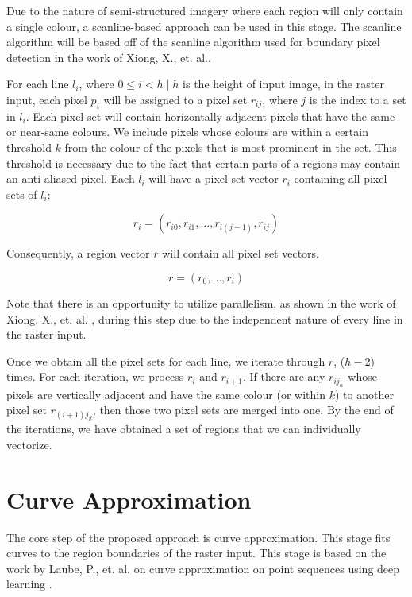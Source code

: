 Due to the nature of semi-structured imagery where each region will only contain a single colour, a scanline-based approach can be used in this stage. The scanline algorithm will be based off of the scanline algorithm used for boundary pixel detection in the work of Xiong, X., et. al..

For each line $l_{i}$, where $0 \leq i < h \mid h$ is the height of input image, in the raster input, each pixel $p_{i}$ will be assigned to a pixel set $r_{ij}$, where $j$ is the index to a set in $l_{i}$. Each pixel set will contain horizontally adjacent pixels that have the same or near-same colours. We include pixels whose colours are within a certain threshold $k$ from the colour of the pixels that is most prominent in the set. This threshold is necessary due to the fact that certain parts of a regions may contain an anti-aliased pixel. Each $l_{i}$ will have a pixel set vector $r_{i}$ containing all pixel sets of $l_{i}$:

$$ r_{i} = (r_{i0}, r_{i1}, \ldots, r_{i(j - 1)}, r_{ij}) $$

Consequently, a region vector $r$ will contain all pixel set vectors.

$$ r = (r_{0}, \ldots, r_{i}) $$

Note that there is an opportunity to utilize parallelism, as shown in the work of Xiong, X., et. al. \cite{realtimevectorizationgpu}, during this step due to the independent nature of every line in the raster input.

Once we obtain all the pixel sets for each line, we iterate through $r$, ($h - 2$) times. For each iteration, we process $r_{i}$ and $r_{i + 1}$. If there are any $r_{ij_{\alpha}}$ whose pixels are vertically adjacent and have the same colour (or within $k$) to another pixel set $r_{(i + 1)j_{\beta}}$, then those two pixel sets are merged into one. By the end of the iterations, we have obtained a set of regions that we can individually vectorize.

\section{Curve Approximation}
The core step of the proposed approach is curve approximation. This stage fits curves to the region boundaries of the raster input. This stage is based on the work by Laube, P., et. al. on curve approximation on point sequences using deep learning \cite{deeplearningparametrization}.


